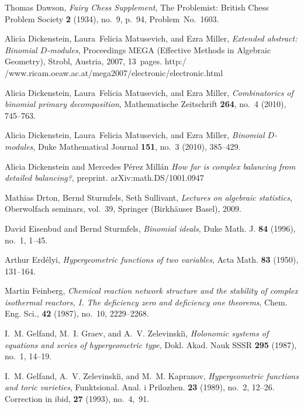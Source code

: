 \documentclass[12pt]{amsart}
\numberwithin{equation}{section}
\theoremstyle{definition}
\begin{document}
Thomas Dawson, \textit{Fairy Chess Supplement}, The Problemist:
  British Chess Problem Society \textbf{2} (1934), no.~9, p.~94,
  Problem~No.~1603.

Alicia Dickenstein, Laura~Felicia Matusevich, and Ezra Miller,
  \emph{Extended abstract: Binomial $D$-modules}, Proceedings MEGA
  (Effective Methods in Algebraic Geometry), Strobl, Austria, 2007,
  13~pages.
  \textsf{http:/$\!$/www.ricam.oeaw.ac.at/mega2007/electronic/electronic.html}

Alicia Dickenstein, Laura~Felicia Matusevich, and Ezra Miller,
  \emph{Combinatorics of binomial primary decomposition},
  Mathematische Zeitschrift \textbf{264}, no.~4 (2010), 745--763.

Alicia Dickenstein, Laura~Felicia Matusevich, and Ezra Miller,
  \emph{Binomial $D$-modules}, Duke Mathematical Journal \textbf{151},
  no.~3 (2010), 385--429.

Alicia Dickenstein and Mercedes P\'erez Mill\'an
\emph{How far is complex balancing from detailed balancing?},
preprint.  \textsf{arXiv:math.DS/1001.0947}

Mathias Drton, Bernd Sturmfels, Seth Sullivant,
\emph{Lectures on algebraic statistics}, Oberwolfach seminars,
vol.~39, Springer (Birkh\"auser Basel), 2009.

David Eisenbud and Bernd Sturmfels, \emph{Binomial ideals}, Duke
   Math. J. \textbf{84} (1996), no.~1, 1--45.

Arthur Erd\'elyi, \emph{Hypergeometric functions of two variables},
  Acta Math. \textbf{83} (1950), 131--164.

Martin Feinberg, \emph{Chemical reaction network structure and the
  stability of complex isothermal reactors, I. The deficiency zero and
  deficiency one theorems}, Chem. Eng. Sci., \textbf{42} (1987),
  no.~10, 2229--2268.

I.~M. Gelfand, M.~I. Graev, and A.~V. Zelevinski\u{\i},
  \emph{Holonomic systems of equations and series of hypergeometric
  type}, Dokl. Akad. Nauk SSSR \textbf{295} (1987), no.~1, 14--19.

I.~M. Gelfand, A.~V. Zelevinski\u{\i}, and M.~M. Kapranov,
  \emph{Hypergeometric functions and toric varieties},
  Funktsional. Anal. i Prilozhen. \textbf{23} (1989), no.~2, 12--26.
  Correction in ibid, \textbf{27} (1993), no.~4,~91. 
\end{document}
